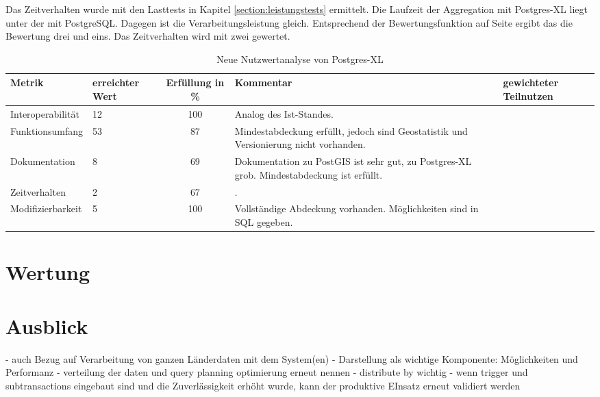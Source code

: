 Das Zeitverhalten wurde mit den Lasttests in Kapitel \ref{section:leistungstests} ermittelt.
Die Laufzeit der Aggregation mit Postgres-XL liegt unter der mit PostgreSQL.
Dagegen ist die Verarbeitungsleistung gleich.
Entsprechend der Bewertungsfunktion auf Seite \pageref{bf:zeitverhalten} ergibt das die Bewertung drei und eins.
Das Zeitverhalten wird mit zwei gewertet.

\begin{table}[h!]
\centering
\small
\begin{tabular}{l|p{1.8cm}|c|p{3.1cm}|p{1.8cm}}
\textbf{Metrik} & \textbf{erreichter Wert} & \textbf{Erfüllung in \%} & \textbf{Kommentar} & \textbf{gewichteter Teilnutzen} \\ \hline
Interoperabilität & 12 & 100 & Analog des Ist-Standes. &  \\ \hline
Funktionsumfang & 53 & 87 & Mindestabdeckung erfüllt, jedoch sind Geostatistik und Versionierung nicht vorhanden. &  \\ \hline
Dokumentation & 8 & 69 & Dokumentation zu PostGIS ist sehr gut, zu Postgres-XL grob. Mindestabdeckung ist erfüllt. &  \\ \hline
Zeitverhalten & 2 & 67 & . &  \\ \hline
Modifizierbarkeit & 5 & 100 & Vollständige Abdeckung vorhanden. Möglichkeiten sind in SQL gegeben. &  \\
\end{tabular}
\caption{Neue Nutzwertanalyse von Postgres-XL}
\label{table:nutzwertanalyse2-postgresxl}
\end{table}


\section{Wertung}

\section{Ausblick}

- auch Bezug auf Verarbeitung von ganzen Länderdaten mit dem System(en)
- Darstellung als wichtige Komponente: Möglichkeiten und Performanz
- verteilung der daten und query planning optimierung erneut nennen
- distribute by wichtig
- wenn trigger und subtransactions eingebaut sind und die Zuverlässigkeit erhöht wurde, kann der produktive EInsatz erneut validiert werden




\label{LastPage}
